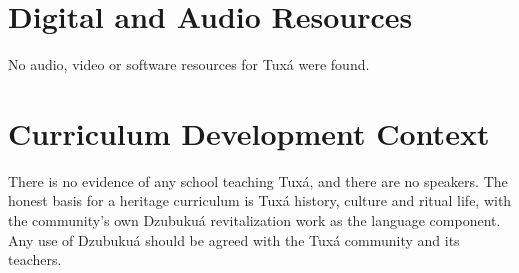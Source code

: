 \documentclass[12pt]{article}
\begin{document}
\section{Digital and Audio Resources}
No audio, video or software resources for Tuxá were found.

\section{Curriculum Development Context}
There is no evidence of any school teaching Tuxá, and there are no speakers. The honest basis for a heritage curriculum is Tuxá history, culture and ritual life, with the community's own Dzubukuá revitalization work as the language component. Any use of Dzubukuá should be agreed with the Tuxá community and its teachers.
\end{document}
